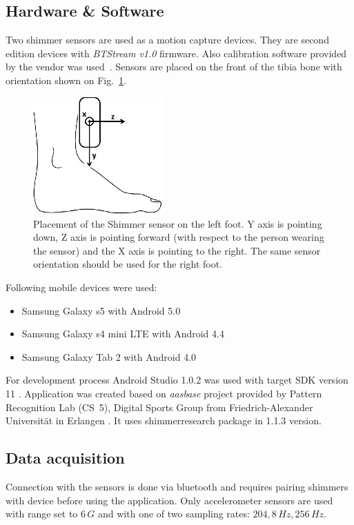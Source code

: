\documentclass[conference]{IEEEtran}
\begin{document}
\subsection{Hardware \& Software}
Two shimmer sensors are used as a motion capture devices.
They are second edition devices with \emph{BTStream v1.0} firmware. Also calibration software provided by the vendor was used~\cite{ShimmerCalibration}.
Sensors are placed on the front of the tibia bone with orientation shown on Fig.~\ref{fig:ShimmerPlacement}.

\begin{figure}[!h]
    \centering
    \includegraphics[width=5cm]{Images/Foot.jpg}
    \caption{Placement of the Shimmer sensor on the left foot.
    Y axis is pointing down, Z axis is pointing forward (with respect to the person wearing the sensor) and the X axis is pointing to the right. The same sensor orientation should be used for the right foot.}
    \label{fig:ShimmerPlacement}
\end{figure}

Following mobile devices were used:
\begin{itemize}
    \item Samsung Galaxy s5 with Android 5.0
    \item Samsung Galaxy s4 mini LTE with Android 4.4
    \item Samsung Galaxy Tab 2 with Android 4.0
\end{itemize}

For development process Android Studio 1.0.2 was used with target SDK version 11 \cite{AndroidStudio}. 
Application was created based on \emph{aasbase} project provided by Pattern Recognition Lab (CS~5), Digital Sports Group from Friedrich-Alexander Universität in Erlangen \cite{CS5}.
It uses shimmerresearch package in 1.1.3 version.


\subsection{Data acquisition}
Connection with the sensors is done via bluetooth and requires pairing shimmers with device before using the application.
Only accelerometer sensors are used with range set to $6\,G$ and with one of two sampling rates: $204,8\,Hz, 256\,Hz$.
\end{document}
